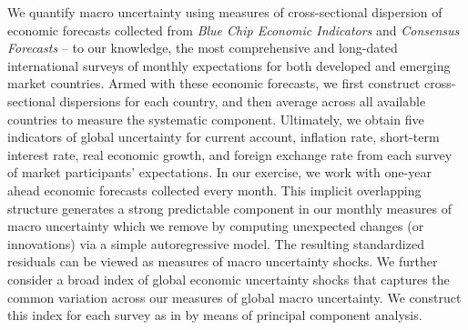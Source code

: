 We quantify macro uncertainty using measures of cross-sectional dispersion of economic forecasts collected from \emph{Blue Chip Economic Indicators} and \emph{Consensus Forecasts} -- to our knowledge, the most comprehensive and long-dated international surveys of monthly expectations for both developed and emerging market countries. Armed with these economic forecasts, we first construct cross-sectional dispersions for each country, and then average across all available countries to measure the systematic component. Ultimately, we obtain five indicators of global uncertainty for current account, inflation rate, short-term interest rate, real economic growth, and foreign exchange rate from each survey of market participants' expectations. In our exercise, we work with one-year ahead economic forecasts collected every month. This implicit overlapping structure generates a strong predictable component in our monthly measures of macro uncertainty which we remove by computing unexpected changes (or innovations) via a simple autoregressive model. The resulting standardized residuals can be viewed as measures of macro uncertainty shocks. We further consider a broad index of global economic uncertainty shocks that captures the common variation across our measures of global macro uncertainty. We construct this index for each survey as in \citet{Bali:2014} by means of principal component analysis.

